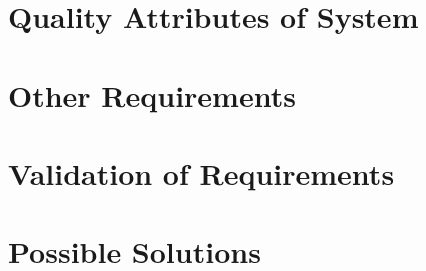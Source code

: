 \documentclass{article}
\begin{document}
\section{Quality Attributes of System}
\section{Other Requirements}
\section{Validation of Requirements}
\section{Possible Solutions}
\end{document}
